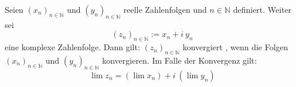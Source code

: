 Seien $(x_n)_{n\in\mathbb{N}}$ und $(y_n)_{n\in\mathbb{N}}$ reelle Zahlenfolgen und $n \in \mathbb{N}$ definiert. Weiter sei
$$(z_n)_{n\in\mathbb{N}} := x_n + i \ y_n$$
eine komplexe Zahlenfolge. Dann gilt: $(z_n)_{n\in\mathbb{N}}$ konvergiert , wenn die Folgen $(x_n)_{n\in\mathbb{N}}$ und $(y_n)_{n\in\mathbb{N}}$  konvergieren.
Im Falle der Konvergenz gilt:
$$\lim z_n = (\lim x_n) + i \ (\lim y_n)$$